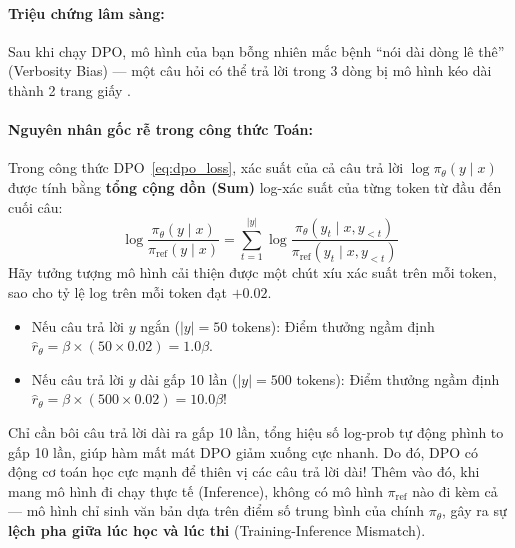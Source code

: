 \paragraph{Triệu chứng lâm sàng:}
Sau khi chạy DPO, mô hình của bạn bỗng nhiên mắc bệnh ``nói dài dòng lê thê'' (Verbosity Bias) --- một câu hỏi có thể trả lời trong 3 dòng bị mô hình kéo dài thành 2 trang giấy \citep{park2024disentangling, meng2024simpo}.

\paragraph{Nguyên nhân gốc rễ trong công thức Toán:}
Trong công thức DPO~\eqref{eq:dpo_loss}, xác suất của cả câu trả lời $\log \pi_\theta(y \mid x)$ được tính bằng \textbf{tổng cộng dồn (Sum)} log-xác suất của từng token từ đầu đến cuối câu:
\begin{equation}
  \log \frac{\pi_\theta(y \mid x)}{\pi_{\text{ref}}(y \mid x)} = \sum_{t=1}^{|y|} \log \frac{\pi_\theta(y_t \mid x, y_{<t})}{\pi_{\text{ref}}(y_t \mid x, y_{<t})}
  \label{eq:dpo_sum_logprob}
\end{equation}
Hãy tưởng tượng mô hình cải thiện được một chút xíu xác suất trên mỗi token, sao cho tỷ lệ log trên mỗi token đạt $+0.02$.
\begin{itemize}
  \item Nếu câu trả lời $y$ ngắn ($|y| = 50$ tokens): Điểm thưởng ngầm định $\hat{r}_\theta = \beta \times (50 \times 0.02) = 1.0 \beta$.
  \item Nếu câu trả lời $y$ dài gấp 10 lần ($|y| = 500$ tokens): Điểm thưởng ngầm định $\hat{r}_\theta = \beta \times (500 \times 0.02) = 10.0 \beta$!
\end{itemize}
Chỉ cần bôi câu trả lời dài ra gấp 10 lần, tổng hiệu số log-prob tự động phình to gấp 10 lần, giúp hàm mất mát DPO giảm xuống cực nhanh. Do đó, DPO có động cơ toán học cực mạnh để thiên vị các câu trả lời dài! Thêm vào đó, khi mang mô hình đi chạy thực tế (Inference), không có mô hình $\pi_{\text{ref}}$ nào đi kèm cả --- mô hình chỉ sinh văn bản dựa trên điểm số trung bình của chính $\pi_\theta$, gây ra sự \textbf{lệch pha giữa lúc học và lúc thi} (Training-Inference Mismatch).

